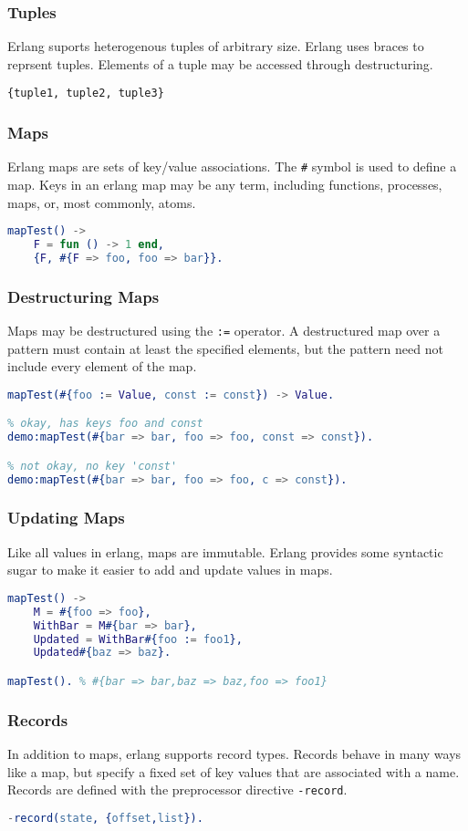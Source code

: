 \documentclass{beamer}
\begin{document}
\begin{frame}[fragile]
  \frametitle{Tuples}
  Erlang suports heterogenous tuples of arbitrary size.  Erlang uses
  braces to reprsent tuples.  Elements of a tuple may be accessed
  through destructuring.

  \verb!{tuple1, tuple2, tuple3}!
\end{frame}

\begin{frame}[fragile]
  \frametitle{Maps}
  Erlang maps are sets of key/value associations.  The \verb!#! symbol
  is used to define a map.  Keys in an erlang map may be any term,
  including functions, processes, maps, or, most commonly, atoms.

\begin{lstlisting}[language=erlang]
mapTest() ->
    F = fun () -> 1 end,
    {F, #{F => foo, foo => bar}}.
\end{lstlisting}
\end{frame}

\begin{frame}[fragile]
  \frametitle{Destructuring Maps}
  Maps may be destructured using the \verb!:=! operator.  A
  destructured map over a pattern must contain at least the specified
  elements, but the pattern need not include every element of the map.

\begin{lstlisting}[language=erlang]
mapTest(#{foo := Value, const := const}) -> Value.

% okay, has keys foo and const
demo:mapTest(#{bar => bar, foo => foo, const => const}).

% not okay, no key 'const'
demo:mapTest(#{bar => bar, foo => foo, c => const}).
\end{lstlisting}
\end{frame}

\begin{frame}[fragile]
  \frametitle{Updating Maps}
  Like all values in erlang, maps are immutable.  Erlang provides some
  syntactic sugar to make it easier to add and update values in maps.
\begin{lstlisting}[language=erlang]
mapTest() ->
    M = #{foo => foo},
    WithBar = M#{bar => bar},
    Updated = WithBar#{foo := foo1},
    Updated#{baz => baz}.

mapTest(). % #{bar => bar,baz => baz,foo => foo1}
\end{lstlisting}
\end{frame}

\begin{frame}[fragile]
  \frametitle{Records}
  In addition to maps, erlang supports record types.  Records behave
  in many ways like a map, but specify a fixed set of key values that
  are associated with a name.  Records are defined with the
  preprocessor directive \verb!-record!.

\begin{lstlisting}[language=erlang]
-record(state, {offset,list}).
\end{lstlisting}
\end{frame}
\end{document}
